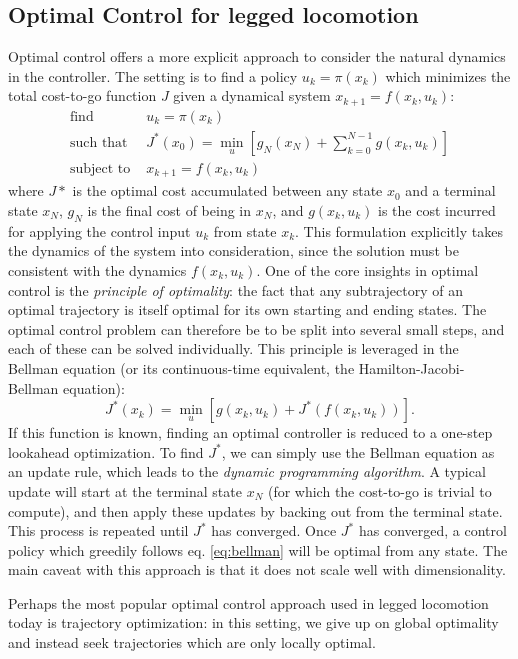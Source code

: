 \subsection{Optimal Control for legged locomotion}
Optimal control offers a more explicit approach to consider the natural dynamics in the controller.
The setting is to find a policy $u_k = \pi(x_k)$  which minimizes the total cost-to-go function $J$ given a dynamical system $x_{k+1} = f(x_k, u_k)$:
\begin{align*}
\text{find } & u_k = \pi(x_k) \\
\text{such that } & J^*(x_0) = \min_u \left[g_N(x_N) + \sum_{k=0}^{N-1}g(x_k, u_k)\right] \\
\text{subject to } & x_{k+1} = f(x_k, u_k)
\end{align*}
where $J*$ is the optimal cost accumulated between any state $x_0$ and a terminal state $x_N$, $g_N$ is the final cost of being in $x_N$, and $g(x_k, u_k)$ is the cost incurred for applying the control input $u_k$ from state $x_k$.
This formulation explicitly takes the dynamics of the system into consideration, since the solution must be consistent with the dynamics $f(x_k, u_k)$.
One of the core insights in optimal control is the \emph{principle of optimality}: the fact that any subtrajectory of an optimal trajectory is itself optimal for its own starting and ending states.
The optimal control problem can therefore be to be split into several small steps, and each of these can be solved individually.
This principle is leveraged in the Bellman equation (or its continuous-time equivalent, the Hamilton-Jacobi-Bellman equation):
\begin{equation}\label{eq:bellman}
J^*(x_k) = \min_u\left[g(x_k,u_k) + J^*(f(x_k, u_k)) \right].
\end{equation}
If this function is known, finding an optimal controller is reduced to a one-step lookahead optimization.
To find $J^*$, we can simply use the Bellman equation as an update rule, which leads to the \emph{dynamic programming algorithm}. A typical update will start at the terminal state $x_N$ (for which the cost-to-go is trivial to compute), and then apply these updates by backing out from the terminal state. This process is repeated until $J^*$ has converged. Once $J^*$ has converged, a control policy which greedily follows eq. \ref{eq:bellman} will be optimal from any state.
The main caveat with this approach is that it does not scale well with dimensionality. \par
Perhaps the most popular optimal control approach used in legged locomotion today is trajectory optimization: in this setting, we give up on global optimality and instead seek trajectories which are only locally optimal.
